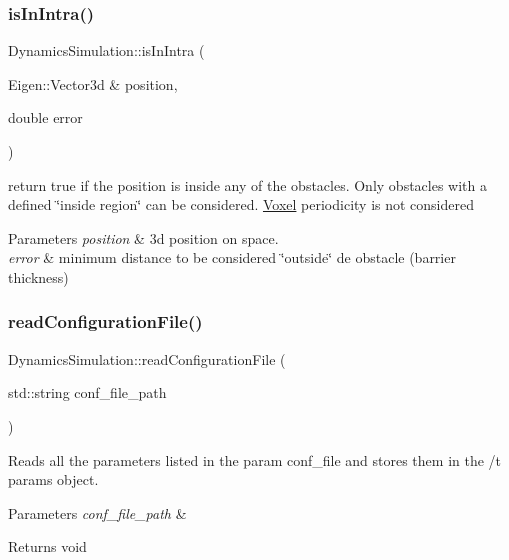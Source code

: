 \subsubsection{\texorpdfstring{is\+In\+Intra()}{isInIntra()}}
{\footnotesize\ttfamily Dynamics\+Simulation\+::is\+In\+Intra (\begin{DoxyParamCaption}\item[{Eigen\+::\+Vector3d \&}]{position,  }\item[{double}]{error }\end{DoxyParamCaption})}



return true if the position is inside any of the obstacles. Only obstacles with a defined \char`\"{}inside region\char`\"{} can be considered. \hyperlink{class_voxel}{Voxel} periodicity is not considered 


\begin{DoxyParams}{Parameters}
{\em position} & 3d position on space. \\
\hline
{\em error} & minimum distance to be considered \char`\"{}outside\char`\"{} de obstacle (barrier thickness) \\
\hline
\end{DoxyParams}
\mbox{\label{class_dynamics_simulation_a67adab75eba635447c1b1b2b26d1e0ab}} 
\subsubsection{\texorpdfstring{read\+Configuration\+File()}{readConfigurationFile()}}
{\footnotesize\ttfamily Dynamics\+Simulation\+::read\+Configuration\+File (\begin{DoxyParamCaption}\item[{std\+::string}]{conf\+\_\+file\+\_\+path }\end{DoxyParamCaption})}



Reads all the parameters listed in the param conf\+\_\+file and stores them in the /t params object. 


\begin{DoxyParams}{Parameters}
{\em conf\+\_\+file\+\_\+path} & \\
\hline
\end{DoxyParams}
\begin{DoxyReturn}{Returns}
void
\end{DoxyReturn}

